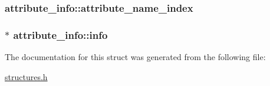\subsubsection[{\texorpdfstring{attribute\+\_\+name\+\_\+index}{attribute_name_index}}]{ attribute\+\_\+info\+::attribute\+\_\+name\+\_\+index}\hypertarget{structattribute__info_a19df9d4b42eb55ca5dc1bed98df89378}{}\label{structattribute__info_a19df9d4b42eb55ca5dc1bed98df89378}
\subsubsection[{\texorpdfstring{info}{info}}]{$\ast$ attribute\+\_\+info\+::info}\hypertarget{structattribute__info_a78e740adccb41defb505248c47093958}{}\label{structattribute__info_a78e740adccb41defb505248c47093958}


The documentation for this struct was generated from the following file\+:\begin{DoxyCompactItemize}
\item 
\hyperlink{structures_8h}{structures.\+h}\end{DoxyCompactItemize}
